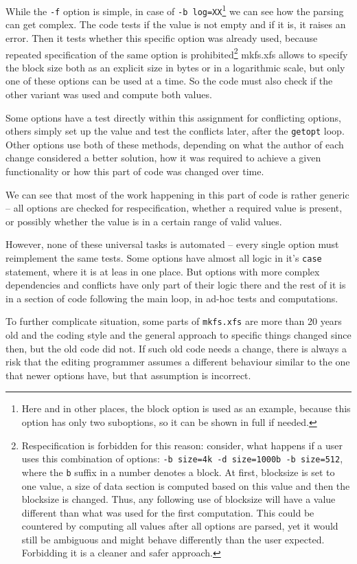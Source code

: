 While the {\tt -f} option is simple, in case of {\tt -b
log=XX}\footnote{Here and in other places, the block option is used as an
example, because this option has only two suboptions, so it can be shown in
full if needed.} we can see how the parsing can get complex. The code tests
if the value is not empty and if it is, it raises an error. Then it tests
whether this specific option was already used, because repeated
specification of the same option is prohibited\footnote{Respecification is
	forbidden for this reason: consider, what happens if a user uses
	this combination of options: {\tt  -b size=4k -d size=1000b -b
	size=512}, where the {\tt b} suffix in a number denotes a block. At
	first, blocksize is set to one value, a size of data section is
	computed based on this value and then the blocksize is changed.
	Thus, any following use of blocksize will have a value different
	than what was used for the first computation. This could be
countered by computing all values after all options are parsed, yet it
would still be ambiguous and might behave differently than the user
expected. Forbidding it is a cleaner and safer approach.} mkfs.xfs allows
to specify the block size both as an explicit size in bytes or in a
logarithmic scale, but only one of these options can be used at a time. So
the code must also check if the other variant was used and compute both
values.

Some options have a test directly within this assignment for conflicting
options, others simply set up the value and test the conflicts later, after
the {\tt getopt} loop. Other options use both of these methods, depending
on what the author of each change considered a better solution, how it was
required to achieve a given functionality or how this part of code was
changed over time.

We can see that most of the work happening in this part of code is
rather generic -- all options are checked for respecification, whether
a required value is present, or possibly whether the value is in a certain
range of valid values.

However, none of these universal tasks is automated -- every single
option must reimplement the same tests. Some options have almost all logic
in it's {\tt case} statement, where it is at leas in one place. But options
with more complex dependencies and conflicts have only part of their logic
there and the rest of it is in a section of code following the main loop,
in ad-hoc tests and computations.

To further complicate situation, some parts of {\tt mkfs.xfs} are more than 20
years old and the coding style and the general approach to specific things
changed since then, but the old code did not. If such old code needs a
change, there is always a risk that the editing programmer assumes a
different behaviour similar to the one that newer options have, but that
assumption is incorrect.

